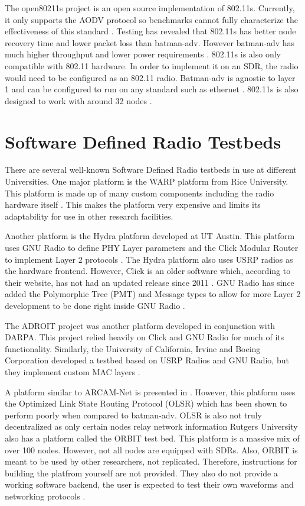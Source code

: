 The open80211s project is an open source implementation of 802.11s. Currently, it only supports the AODV protocol so benchmarks cannot fully characterize the effectiveness of this standard \cite{5483777}. Testing has revealed that 802.11s has better node recovery time and lower packet loss than batman-adv. However batman-adv has much higher throughput and lower power requirements \cite{5483777} \cite{6379142}. 802.11s is also only compatible with 802.11 hardware. In order to implement it on an SDR, the radio would need to be configured as an 802.11 radio. Batman-adv is agnostic to layer 1 and can be configured to run on any standard such as ethernet \cite{5483777}. 802.11s is also designed to work with around 32 nodes \cite{ieee802tut}. 


\section{Software Defined Radio Testbeds}

There are several well-known Software Defined Radio testbeds in use at different Universities. One major platform is the WARP platform from Rice University. This platform is made up of many custom components including the radio hardware itself \cite{7071706}. This makes the platform very expensive and limits its adaptability for use in other research facilities. 

Another platform is the Hydra platform developed at UT Austin. This platform uses GNU Radio to define PHY Layer parameters and the Click Modular Router to implement Layer 2 protocols \cite{4212821}. The Hydra platform also uses USRP radios as the hardware frontend. However, Click is an older software which, according to their website, has not had an updated release since 2011 \cite{0009}. GNU Radio has since added the Polymorphic Tree (PMT) and Message types to allow for more Layer 2 development to be done right inside GNU Radio \cite{0010}. 

The ADROIT project was another platform developed in conjunction with DARPA. This project relied heavily on Click and GNU Radio for much of its functionality. \cite{4286321}  Similarly, the University of California, Irvine and Boeing Corporation developed a testbed based on USRP Radios and GNU Radio, but they implement custom MAC layers \cite{4753441}. 

A platform similar to ARCAM-Net is presented in \cite{0002}. However, this platform uses the Optimized Link State Routing Protocol (OLSR) which has been shown to perform poorly when compared to batman-adv. OLSR is also not truly decentralized as only certain nodes relay network information \cite{5375690} Rutgers University also has a platform called the ORBIT test bed. This platform is a massive mix of over 100 nodes. However, not all nodes are equipped with SDRs. Also, ORBIT is meant to be used by other researchers, not replicated. Therefore, instructions for building the platfrom yourself are not provided. They also do not provide a working software backend, the user is expected to test their own waveforms and networking protocols \cite{1386189}. 
  
